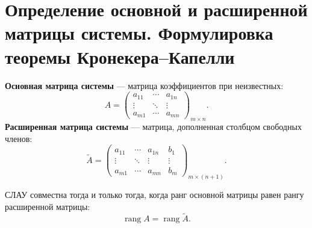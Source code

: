 \section{Определение основной и расширенной матрицы системы. Формулировка теоремы Кронекера--Капелли}

\begin{definition}
\textbf{Основная матрица системы} --- матрица коэффициентов при неизвестных:
\[
A = \begin{pmatrix}
a_{11} & \cdots & a_{1n} \\
\vdots & \ddots & \vdots \\
a_{m1} & \cdots & a_{mn}
\end{pmatrix}_{m \times n}.
\]
\textbf{Расширенная матрица системы} --- матрица, дополненная столбцом свободных членов:
\[
\tilde{A} = \begin{pmatrix}
a_{11} & \cdots & a_{1n} & b_1 \\
\vdots & \ddots & \vdots & \vdots \\
a_{m1} & \cdots & a_{mn} & b_m
\end{pmatrix}_{m \times (n+1)}.
\]
\end{definition}

\begin{theorem}
СЛАУ совместна тогда и только тогда, когда ранг основной матрицы равен рангу расширенной матрицы:
\[
\operatorname{rang} A = \operatorname{rang} \tilde{A}.
\]
\end{theorem}
